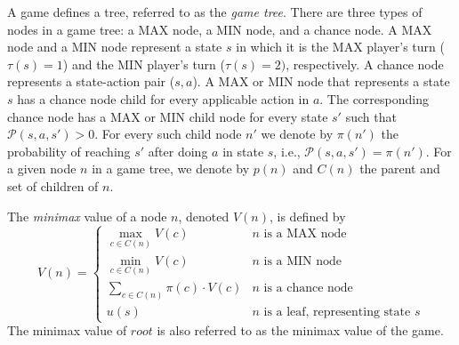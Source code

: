 \documentclass[letterpaper]{article} %
\newcommand{\MM}{\mathit{V}}
\newcommand{\rootnode}{\mathit{root}}
\begin{document}
A game defines a tree, referred to as the \emph{game tree}. There are three types of nodes in a game tree: a MAX node, a MIN node, and a chance node. 
A MAX node and a MIN node represent a state $s$ in which it is the MAX player's  turn ($\tau(s)=1$) and the MIN player's turn ($\tau(s)=2)$, respectively. 
A chance node represents a state-action pair ($s,a$). 
A MAX or MIN node that represents a state $s$ 
has a chance node child for every applicable action in $a$. 
The corresponding chance node has a MAX or MIN child node for every state $s'$ 
such that $\mathcal{P}(s,a,s')>0$. For every such child node $n'$ we denote by $\pi(n')$ the probability of reaching $s'$ after doing $a$ in state $s$, i.e., $\mathcal{P}(s,a,s')=\pi(n')$. 
For a given node $n$ in a game tree, we denote by $p(n)$ and $C(n)$ the parent and set of children of $n$. 



The \emph{minimax} value of a node $n$, denoted $\MM(n)$, is defined by
\begin{equation} 
\MM(n) =
\begin{cases} 
      \max\limits_{c\in C(n)} \MM(c) & n \text{ is a MAX node} \\
      \min\limits_{c\in C(n)} \MM(c) & n \text{ is a MIN node} \\
      \sum\limits_{c\in C(n)} \pi(c)\cdot \MM(c) & n \text{ is a chance node} \\
      u(s) & n \text{ is a leaf, representing state $s$}
   \end{cases}
   \label{eq:mm-value-chance}
\end{equation}
The minimax value of $\rootnode{}$ is also referred to as the minimax value of the game. 
\end{document}
